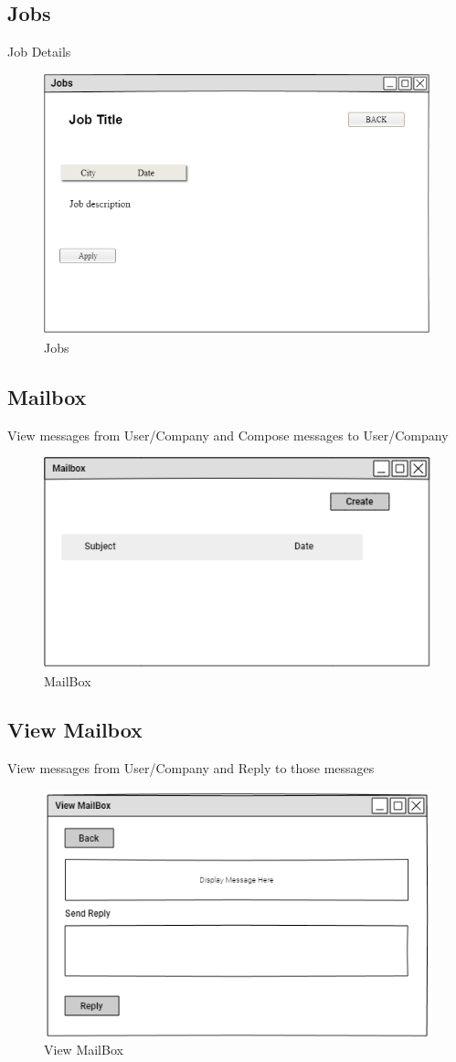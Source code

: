 \documentclass[a4paper,12pt]{report}
\begin{document}
\subsection {Jobs}
Job Details
\begin{figure}[bph]
	\centering
	\includegraphics[width=.6\linewidth]{img/searchjobapply}
	\caption{Jobs}
\end{figure}
\pagebreak

\subsection {Mailbox}
View messages from User/Company and Compose messages to User/Company
\begin{figure}[bph]
	\centering
	\includegraphics[width=.7\linewidth]{img/notification}
	\caption{MailBox}
\end{figure}


\subsection {View Mailbox}
View messages from User/Company and Reply to those messages
\begin{figure}[bph]
	\centering
	\includegraphics[width=.7\linewidth]{img/view_notifctn}
	\caption{View MailBox}
\end{figure}
\pagebreak
\end{document}

